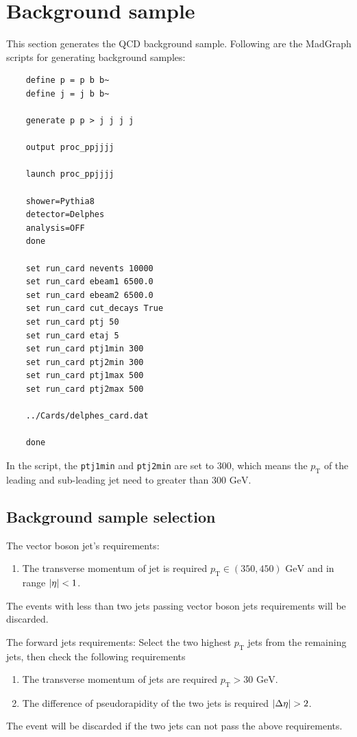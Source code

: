 \documentclass[12pt]{article}
\begin{document}
\section{Background sample}%
\label{sec:background_sample}
	This section generates the QCD background sample. Following are the MadGraph scripts for generating background samples:
	\begin{verbatim}
	define p = p b b~
	define j = j b b~

	generate p p > j j j j

	output proc_ppjjjj

	launch proc_ppjjjj

	shower=Pythia8
	detector=Delphes
	analysis=OFF
	done

	set run_card nevents 10000
	set run_card ebeam1 6500.0
	set run_card ebeam2 6500.0
	set run_card cut_decays True
	set run_card ptj 50
	set run_card etaj 5
	set run_card ptj1min 300
	set run_card ptj2min 300
	set run_card ptj1max 500
	set run_card ptj2max 500

	../Cards/delphes_card.dat

	done
	\end{verbatim}
	In the script, the \verb+ptj1min+ and \verb+ptj2min+ are set to 300, which means the $p_\text{T}$ of the leading and sub-leading jet need to greater than $300\text{ GeV}$. 
	\subsection{Background sample selection}%
	\label{sub:background_sample_selection}
		The vector boson jet's requirements:
		\begin{enumerate}
			\item The transverse momentum of jet is required $p_\text{T} \in (350, 450) \text{ GeV}$ and in range $\abs{\eta}<1$.
		\end{enumerate}
		The events with less than two jets passing vector boson jets requirements will be discarded.

		The forward jets requirements: Select the two highest $p_\text{T}$ jets from the remaining jets, then check the following requirements
		\begin{enumerate}
			\item The transverse momentum of jets are required $p_\text{T} > \text{30 GeV}$.
			\item The difference of pseudorapidity of the two jets is required $\abs{\Delta \eta} > 2$.
		\end{enumerate}
		The event will be discarded if the two jets can not pass the above requirements.
\end{document}

